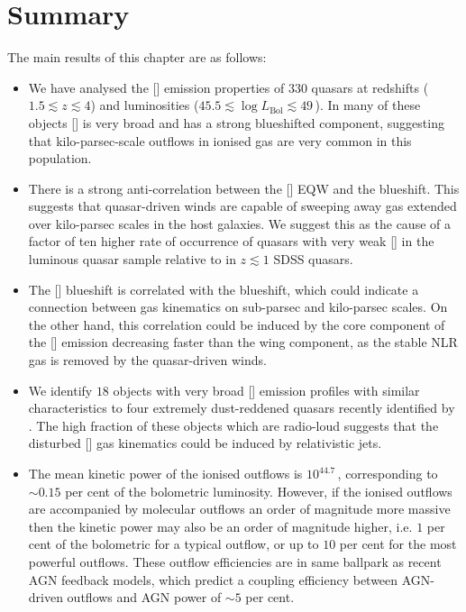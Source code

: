 \section{Summary}

The main results of this chapter are as follows: 

\begin{itemize}

\item We have analysed the [] emission properties of $330$ quasars at redshifts ($1.5 \lesssim z \lesssim 4$) and luminosities ($45.5 \lesssim \log L_{\text{Bol}} \lesssim 49$\,\ergs). In many of these objects [] is very broad and has a strong blueshifted component, suggesting that kilo-parsec-scale outflows in ionised gas are very common in this population. 

\item There is a strong anti-correlation between the [] EQW and the  blueshift. This suggests that quasar-driven winds are capable of sweeping away gas extended over kilo-parsec scales in the host galaxies. We suggest this as the cause of a factor of ten higher rate of occurrence of quasars with very weak [] in the luminous quasar sample relative to in $z \lesssim 1$ SDSS quasars. 

\item The [] blueshift is correlated with the  blueshift, which could indicate a connection between gas kinematics on sub-parsec and kilo-parsec scales. On the other hand, this correlation could be induced by the core component of the [] emission decreasing faster than the wing component, as the stable NLR gas is removed by the quasar-driven winds.  

\item We identify $18$ objects with very broad [] emission profiles with similar characteristics to four extremely dust-reddened quasars recently identified by \citet{zakamska16}. The high fraction of these objects which are radio-loud suggests that the disturbed [] gas kinematics could be induced by relativistic jets. 

\item The mean kinetic power of the ionised outflows is $10^{44.7}$\,\ergs, corresponding to $\sim0.15$ per cent of the bolometric luminosity. However, if the ionised outflows are accompanied by molecular outflows an order of magnitude more massive then the kinetic power may also be an order of magnitude higher, i.e. $1$ per cent of the bolometric for a typical outflow, or up to $10$ per cent for the most powerful outflows. These outflow efficiencies are in same ballpark as recent AGN feedback models, which predict a coupling efficiency between AGN-driven outflows and AGN power of $\sim5$ per cent.  


\end{itemize}
